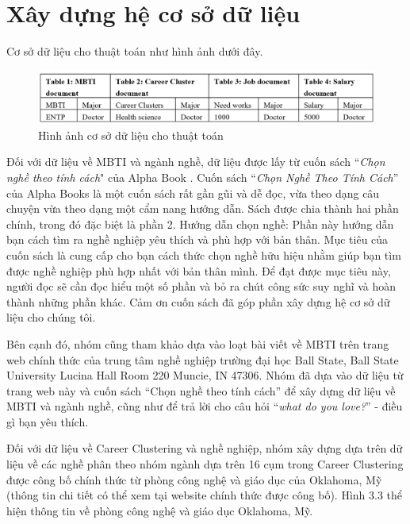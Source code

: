 \section{Xây dựng hệ cơ sở dữ liệu}\label{3.1}
Cơ sở dữ liệu cho thuật toán như hình ảnh dưới đây. 

\begin{figure}[H]
    \centering
    \includegraphics[width=0.8\linewidth]{images/chap3/data.png}
    \vspace{0.5cm}
    \caption{Hình ảnh cơ sở dữ liệu cho thuật toán}
\end{figure}

Đối với dữ liệu về MBTI và ngành nghề, dữ liệu được lấy từ cuốn sách ``\textit{Chọn nghề theo tính cách}" của Alpha Book \cite{alpha}. Cuốn sách ``\textit{Chọn Nghề Theo Tính Cách}” của Alpha Books là một cuốn sách rất gần gũi và dễ đọc, vừa theo dạng câu chuyện vừa theo dạng một cẩm nang hướng dẫn. Sách được chia thành hai phần chính, trong đó đặc biệt là phần 2. Hướng dẫn chọn nghề: Phần này hướng dẫn bạn cách tìm ra nghề nghiệp yêu thích và phù hợp với bản thân. Mục tiêu của cuốn sách là cung cấp cho bạn cách thức chọn nghề hữu hiệu nhằm giúp bạn tìm được nghề nghiệp phù hợp nhất với bản thân mình. Để đạt được mục tiêu này, người đọc sẽ cần đọc hiểu một số phần và bỏ ra chút công sức suy nghĩ và hoàn thành những phần khác. Cảm ơn cuốn sách đã góp phần xây dựng hệ cơ sở dữ liệu cho chúng tôi. 

Bên cạnh đó, nhóm cũng tham khảo dựa vào loạt bài viết về MBTI trên trang web chính thức của trung tâm nghề nghiệp trường đại học Ball State, Ball State University Lucina Hall Room 220 Muncie, IN 47306. Nhóm đã dựa vào dữ liệu từ trang web này và cuốn sách ``Chọn nghề theo tính cách” để xây dựng dữ liệu về MBTI và ngành nghề, cũng như để trả lời cho câu hỏi ``\textit{what do you love?}” - điều gì bạn yêu thích. 

Đối với dữ liệu về Career Clustering và nghề nghiệp, nhóm xây dựng dựa trên dữ liệu về các nghề phân theo nhóm ngành dựa trên 16 cụm trong Career Clustering được công bố chính thức từ phòng công nghệ và giáo dục của Oklahoma, Mỹ (thông tin chi tiết có thể xem tại website chính thức được công bố). Hình 3.3 thể hiện thông tin về phòng công nghệ và giáo dục Oklahoma, Mỹ.

